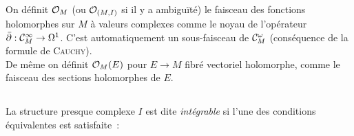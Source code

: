 \documentclass[a4paper,11pt,draft,makeidx,twocolumn]{amsart}
\begin{document}
\subsection{} On définit $\mathcal{O}_M$ (ou $\mathcal{O}_{(M,I)}$ si il y a ambiguïté) le faisceau des fonctions holomorphes sur $M$ à valeurs complexes comme le noyau de l’opérateur $\operatorname{\bar{\partial}} : \mathcal{C}^\infty_M \rightarrow \Omega^1$. C'est automatiquement un sous-faisceau de $\mathcal{C}^\omega_M$ (conséquence de la formule de \textsc{Cauchy}).\\
De même on définit $\mathcal{O}_M(E)$ pour $E \rightarrow M$ fibré vectoriel holomorphe, comme le faisceau des sections holomorphes de $E$.
\subsection{\label{integrabilité}} La structure presque complexe $I$ est dite \emph{intégrable} si l'une des conditions équivalentes est satisfaite~:
\end{document}
